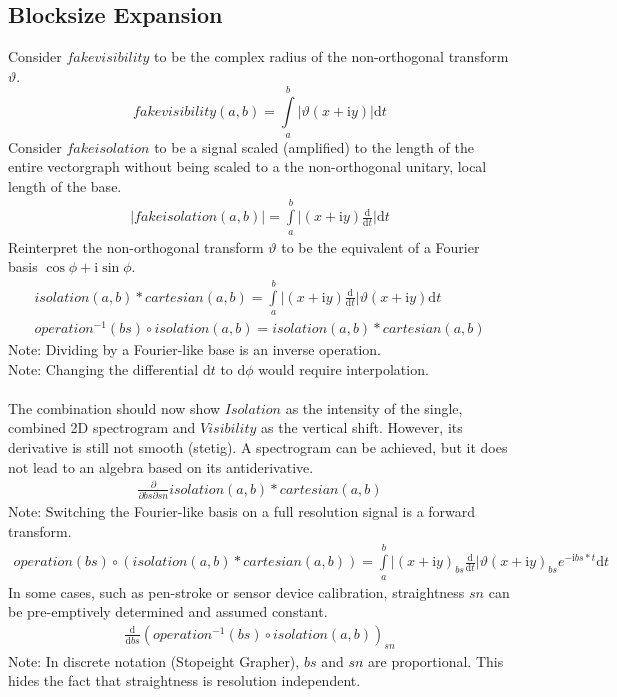 \documentclass{report}
\begin{document}
\subsection{Blocksize Expansion}
Consider $fake visibility$ to be the complex radius of the non-orthogonal transform $\vartheta$.
\begin{equation}
fakevisibility(a,b)=\int \limits _{a}^{b} \lvert \vartheta (x+\mathrm{i}y) \rvert \mathrm{d}t 
\end{equation}
Consider $fake isolation$ to be a signal scaled (amplified) to the length of the entire vectorgraph without being scaled to a the non-orthogonal unitary, local length of the base.
\begin{align}
\lvert fakeisolation(a,b) \rvert = \int \limits _{a}^{b} \lvert (x+\mathrm{i}y) \frac{\mathrm{d}}{\mathrm{d}t} \rvert \mathrm{d}t
\end{align}
Reinterpret the non-orthogonal transform $\vartheta$ to be the equivalent of a Fourier basis $\cos \phi + \mathrm{i} \sin \phi$.
\begin{align}
isolation(a,b) * cartesian(a,b) = \int \limits _{a}^{b} \lvert (x+\mathrm{i}y) \frac{\mathrm{d}}{\mathrm{d}t} \rvert \vartheta (x+\mathrm{i}y) \mathrm{d}t\\
operation^{-1}(bs) \circ isolation(a,b) = isolation(a,b) * cartesian(a,b)
\end{align}
Note: Dividing by a Fourier-like base is an inverse operation.\\
Note: Changing the differential $\mathrm{d}t$ to $\mathrm{d}\phi$ would require interpolation.\\\\
The combination should now show $Isolation$ as the intensity of the single, combined 2D spectrogram and $Visibility$ as the vertical shift. However, its derivative is still not smooth (stetig). A spectrogram can be achieved, but it does not lead to an algebra based on its antiderivative.
\begin{align}
\frac{\partial}{\partial bs\partial sn} isolation(a,b) * cartesian(a,b)\label{eq:3}
\end{align}
Note: Switching the Fourier-like basis on a full resolution signal is a forward transform.
\begin{align}
operation(bs) \circ (isolation(a,b) * cartesian(a,b)) = \int \limits _{a}^{b} \lvert (x+\mathrm{i}y)_{bs} \frac{\mathrm{d}}{\mathrm{d}t} \rvert \vartheta (x+\mathrm{i}y)_{bs} e^{-\mathrm{i}bs*t} \mathrm{d}t
\end{align}
In some cases, such as pen-stroke or sensor device calibration, straightness $sn$ can be pre-emptively determined and assumed constant.
\begin{align}
\frac{\mathrm{d}}{\mathrm{d} bs} (operation^{-1}(bs) \circ isolation(a,b))_{sn}
\end{align}
Note: In discrete notation (Stopeight Grapher), $bs$ and $sn$ are proportional. This hides the fact that straightness is resolution independent.
\end{document}
